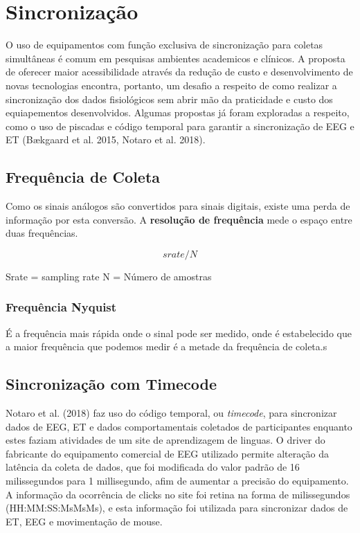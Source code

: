 \chapter{Sincronização}

O uso de equipamentos com função exclusiva de sincronização para coletas simultâneas é comum em pesquisas ambientes academicos e clínicos.
A proposta de oferecer maior acessibilidade através da redução de custo e desenvolvimento de novas tecnologias encontra, portanto, um desafio a respeito 
de como realizar a sincronização dos dados fisiológicos sem abrir mão da praticidade e custo dos equiapementos desenvolvidos. 
Algumas propostas já foram exploradas a respeito, como o uso de piscadas e código temporal para garantir a sincronização de EEG e ET (Bækgaard et al. 2015, Notaro et al. 2018).

\section{Frequência de Coleta}
Como os sinais análogos são convertidos para sinais digitais, existe uma perda de informação por esta conversão. 
A \textbf{resolução de frequência} mede o espaço entre duas frequências. 

$$srate/N$$

Srate = sampling rate 
N = Número de amostras

\subsection{Frequência Nyquist}
É a frequência mais rápida onde o sinal pode ser medido, onde é estabelecido que a maior frequência que podemos medir é a metade 
da frequência de coleta.s


\section{Sincronização com Timecode}
Notaro et al. (2018) faz uso do código temporal, ou \textit{timecode}, para sincronizar dados de EEG, ET e dados comportamentais 
coletados de participantes enquanto estes faziam atividades de um site de aprendizagem de linguas. O driver
do fabricante do equipamento comercial de EEG utilizado permite alteração da latência da coleta de dados, que
foi modificada do valor padrão de 16 milissegundos para 1 millisegundo, afim de aumentar a precisão do equipamento.
A informação da ocorrência de clicks no site foi retina na forma de milissegundos (HH:MM:SS:MsMsMs), e esta informação foi utilizada 
para sincronizar dados de ET, EEG e movimentação de mouse. 

